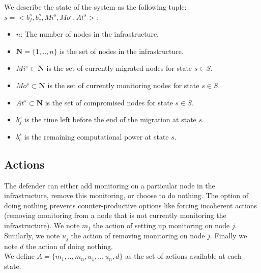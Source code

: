 
We describe the state of the system as the following tuple: $s=<b_f^s,b_c^s,Mi^s,Mo^s,At^s>$: 
\begin{itemize}
    \item $n$: The number of nodes in the infrastructure.
    \item $\textbf{N} = \{1,..,n\}$ is the set of nodes in the infrastructure.
    \item $Mi^s \subset \textbf{N} $ is the set of currently migrated nodes for state $s\in S$.
    \item $Mo^s \subset \textbf{N}$ is the set of currently monitoring nodes for state $s\in S$.
    \item $At^s \subset \textbf{N}$ is the set of compromised nodes for state $s \in S$.
    \item $b_f^s$ is the time left before the end of the migration at state $s$.
    \item $b_c^s$ is the remaining computational power at state $s$.
\end{itemize}


\subsection{Actions}
\label{sec:actionset}
The defender can either add monitoring on a particular node in the infrastructure, remove this monitoring, or choose to do nothing.
The option of doing nothing prevents counter-productive options like forcing incoherent actions (\eg removing monitoring from a node that is not currently monitoring the infrastructure). 
We note $m_j$ the action of setting up monitoring on node $j$. Similarly, we note $u_j$ the action of removing monitoring on node $j$.
Finally we note $d$ the action of doing nothing.
\\We define $A = \{m_1,..,m_n,u_1,..,u_n,d\}$ as the set of actions available at each state.

